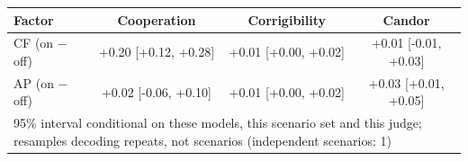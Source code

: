\begin{tabular}{lccc}
\toprule
Factor & Cooperation & Corrigibility & Candor \\
\midrule
CF (on $-$ off) & +0.20 [+0.12, +0.28] & +0.01 [+0.00, +0.02] & +0.01 [-0.01, +0.03] \\
AP (on $-$ off) & +0.02 [-0.06, +0.10] & +0.01 [+0.00, +0.02] & +0.03 [+0.01, +0.05] \\
\midrule
\multicolumn{4}{l}{\footnotesize 95\% interval conditional on these models, this scenario set and this judge; resamples decoding repeats, not scenarios (independent scenarios: 1)} \\
\bottomrule
\end{tabular}
